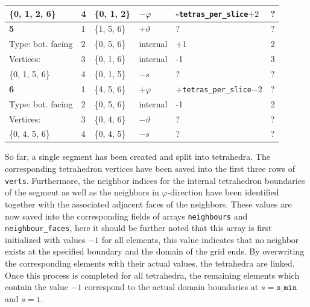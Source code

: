 \documentclass[./main.tex]{subfiles}
\begin{document}
\begin{centering}
\begin{table}[H]
\begin{tabular}{|l|l|l|l|l|l|}
			\{0, 1, 2, 6\}							&4		&\{0, 1, 2\}		&$-\varphi$		&-\texttt{tetras\_per\_slice}$+2$	&?\\
\hline
			\textbf{5}					&1		&\{1, 5, 6\}		&$+\vartheta$	&?			&?		\\
			Type: bot. facing			&2		&\{0, 5, 6\}		&internal		&+1			&2		\\
			Vertices: 	&3		&\{0, 1, 6\}		&internal		&-1			&3		\\
			\{0, 1, 5, 6\}							&4		&\{0, 1, 5\}		&$-s$			&?			&?		\\
\hline
			\textbf{6}					&1		&\{4, 5, 6\}		&$+\varphi$		&+\texttt{tetras\_per\_slice}$-2$	&?\\
			Type: bot. facing			&2		&\{0, 5, 6\}		&internal		&-1			&2		\\
			Vertices: 	&3		&\{0, 4, 6\}		&$-\vartheta$	&?			&?		\\
			\{0, 4, 5, 6\}							&4		&\{0, 4, 5\}		&$-s$			&?			&?		\\
\hline
		\end{tabular}
		\label{tab:tetrahedron_boundaries}	
	\end{table}
\end{centering}

So far, a single segment has been created and split into tetrahedra. The corresponding tetrahedron vertices have been saved into the first three rows of \texttt{verts}. Furthermore, the neighbor indices for the internal tetrahedron boundaries of the segment as well as the neighbors in $\varphi$-direction have been identified together with the associated adjacent faces of the neighbors. 
These values are now saved into the corresponding fields of arrays \texttt{neighbours} and \texttt{neighbour\_faces}, here it should be further noted that this array is first initialized with values $-1$ for all elements, this value indicates that no neighbor exists at the specified boundary and the domain of the grid ends. By overwriting the corresponding elements with their actual values, the tetrahedra are linked. Once this process is completed for all tetrahedra, the remaining elements which contain the value $-1$ correspond to the actual domain boundaries at $s = \texttt{s\_min}$ and $s = 1$. 
\end{document}
